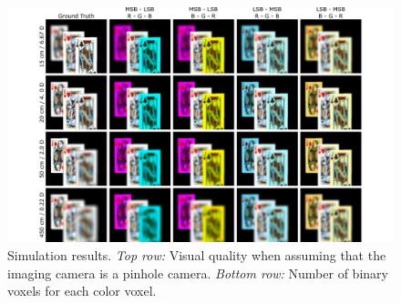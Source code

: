 \begin{figure}[h!]
\centering
\includegraphics[width=0.99\columnwidth]{images/volumetric/acd_exp8/exp_FS}
\caption[Adaptive color decomposition: focal stack]{Simulation results. \emph{Top row:} Visual quality when assuming that the imaging camera is a pinhole camera. \emph{Bottom row:} Number of binary voxels for each color voxel.}
\label{fig:volumetric:acd:exp8:focalstack}
\end{figure}

